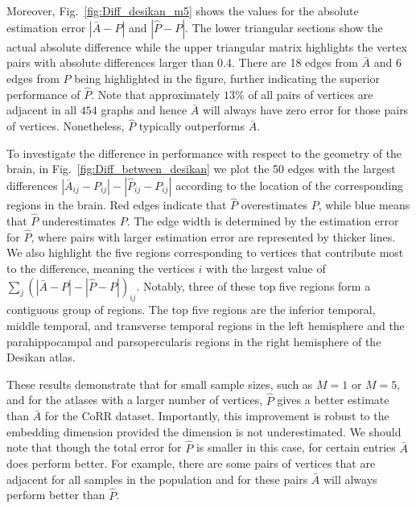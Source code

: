\documentclass[10pt,letterpaper]{article}
\renewcommand{\hat}{\widehat}
\begin{document}
Moreover, Fig.~\ref{fig:Diff_desikan_m5} shows the values for the absolute estimation error $|\bar{A} - P|$ and $|\hat{P}-P|$. The lower triangular sections show the actual absolute difference while the upper triangular matrix highlights the vertex pairs with absolute differences larger than 0.4. 
There are 18 edges from $\bar{A}$ and 6 edges from $\hat{P}$ being highlighted in the figure, further indicating the superior performance of $\hat{P}$.
Note that approximately $13\%$ of all pairs of vertices are adjacent in all $454$ graphs and hence $\bar{A}$ will always have zero error for those pairs of vertices.
Nonetheless, $\hat{P}$ typically outperforms $\bar{A}$.

To investigate the difference in performance with respect to the geometry of the brain, 
in Fig.~\ref{fig:Diff_between_desikan} we plot the 50 edges with the largest differences $|\bar{A}_{ij} - P_{ij}| - |\hat{P}_{ij} - P_{ij}|$ according to the location of the corresponding regions in the brain. Red edges indicate that $\hat{P}$ overestimates $P$, while blue means that $\hat{P}$ underestimates $P$. The edge width is determined by the estimation error for $\hat{P}$, where pairs with larger estimation error are represented by thicker lines.
We also highlight the five regions corresponding to vertices that contribute most to the difference, meaning the vertices $i$ with the largest value of $\sum_j (|\bar{A} - P| - |\hat{P} - P|)_{ij}$.
Notably, three of these top five regions form a contiguous group of regions.
The top five regions are the inferior temporal, middle temporal, and transverse temporal regions in the left hemisphere and the parahippocampal and parsopercularis regions in the right hemisphere of the Desikan atlas.

These results demonstrate that for small sample sizes, such as $M=1$ or $M=5$, and for the atlases with a larger number of vertices, $\hat{P}$ gives a better estimate than $\bar{A}$ for the CoRR dataset.
Importantly, this improvement is robust to the embedding dimension provided the dimension is not underestimated.
We should note that though the total error for $\hat{P}$ is smaller in this case, for certain entries $\bar{A}$ does perform better.
For example, there are some pairs of vertices that are adjacent for all samples in the population and for these pairs $\bar{A}$ will always perform better than $\hat{P}$. 
\end{document}
